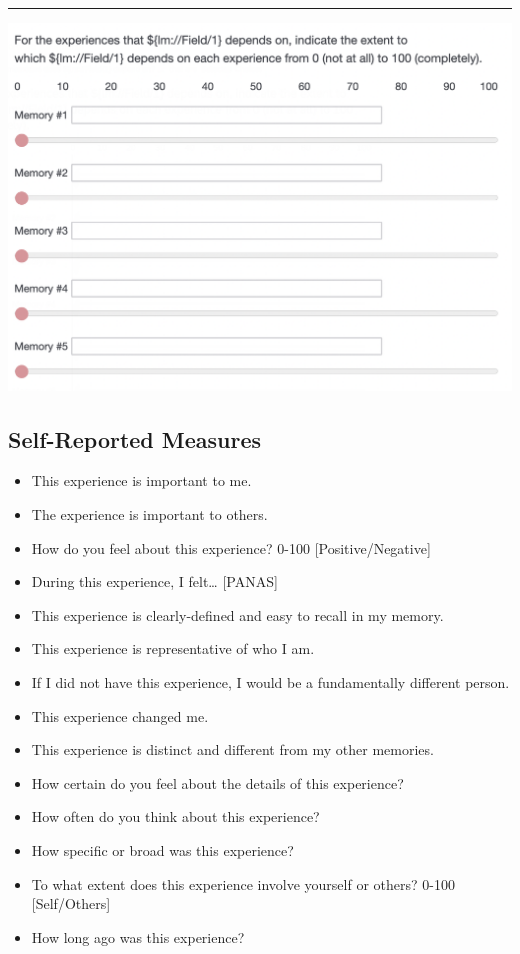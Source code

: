 \documentclass[
  .7em,
  letterpaper,
  DIV=11,
  numbers=noendperiod]{scrartcl}
\providecommand{\tightlist}{%
  \setlength{\itemsep}{0pt}\setlength{\parskip}{0pt}}\usepackage{longtable,booktabs,array}
\begin{document}
\begin{center}\rule{0.5\linewidth}{0.5pt}\end{center}

\includegraphics{images/Screen Shot 2023-01-27 at 10.29.31 PM.png}

\hypertarget{self-reported-measures}{%
\subsection{Self-Reported Measures}\label{self-reported-measures}}

\begin{itemize}
\tightlist
\item
  This experience is important to me.
\item
  The experience is important to others.
\item
  How do you feel about this experience? 0-100 {[}Positive/Negative{]}
\item
  During this experience, I felt\ldots{} {[}PANAS{]}
\item
  This experience is clearly-defined and easy to recall in my memory.
\item
  This experience is representative of who I am.
\item
  If I did not have this experience, I would be a fundamentally
  different person.
\item
  This experience changed me.
\item
  This experience is distinct and different from my other memories.
\item
  How certain do you feel about the details of this experience?
\item
  How often do you think about this experience?
\item
  How specific or broad was this experience?
\item
  To what extent does this experience involve yourself or others? 0-100
  {[}Self/Others{]}
\item
  How long ago was this experience?
\end{itemize}
\end{document}
